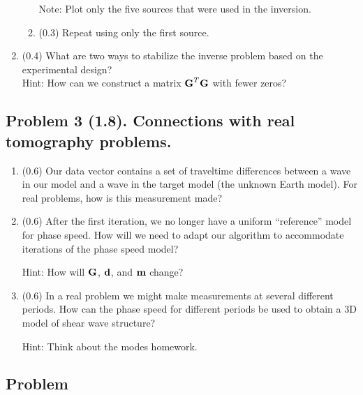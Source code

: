 \documentclass[11pt,titlepage,fleqn]{article}
\begin{document}
\begin{enumerate}
\begin{enumerate}
Note: Plot only the five sources that were used in the inversion.

\item (0.3) Repeat using only the first source.
\end{enumerate}

\item (0.4) What are two ways to stabilize the inverse problem based on the experimental design? \\
Hint: How can we construct a matrix $\mbox{${\bf G}$}^T\mbox{${\bf G}$}$ with fewer zeros?

\end{enumerate}


\pagebreak
\subsection*{Problem 3 (1.8). Connections with real tomography problems.}

\begin{enumerate}
\item (0.6) Our data vector contains a set of traveltime differences between a wave in our model and a wave in the target model (\ie the unknown Earth model). For real problems, how is this measurement made?

\item (0.6) After the first iteration, we no longer have a uniform ``reference'' model for phase speed. How will we need to adapt our algorithm to accommodate iterations of the phase speed model?

Hint: How will $\mbox{${\bf G}$}$, $\mbox{${\bf d}$}$, and $\mbox{${\bf m}$}$ change?

\item (0.6) In a real problem we might make measurements at several different periods. How can the phase speed for different periods be used to obtain a 3D model of shear wave structure?

Hint: Think about the modes homework.

\end{enumerate}


\subsection*{Problem} \howmuchtime\



\end{document}
